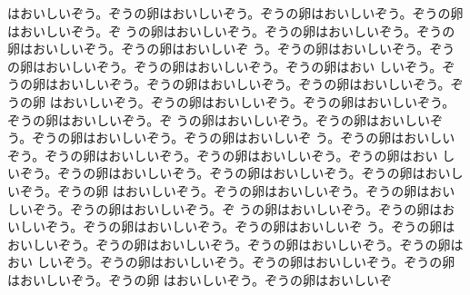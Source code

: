 はおいしいぞう。ぞうの卵はおいしいぞう。ぞうの卵はおいしいぞう。ぞうの卵はおいしいぞう。ぞ
うの卵はおいしいぞう。ぞうの卵はおいしいぞう。ぞうの卵はおいしいぞう。ぞうの卵はおいしいぞ
う。ぞうの卵はおいしいぞう。ぞうの卵はおいしいぞう。ぞうの卵はおいしいぞう。ぞうの卵はおい
しいぞう。ぞうの卵はおいしいぞう。ぞうの卵はおいしいぞう。ぞうの卵はおいしいぞう。ぞうの卵
はおいしいぞう。ぞうの卵はおいしいぞう。ぞうの卵はおいしいぞう。ぞうの卵はおいしいぞう。ぞ
うの卵はおいしいぞう。ぞうの卵はおいしいぞう。ぞうの卵はおいしいぞう。ぞうの卵はおいしいぞ
う。ぞうの卵はおいしいぞう。ぞうの卵はおいしいぞう。ぞうの卵はおいしいぞう。ぞうの卵はおい
しいぞう。ぞうの卵はおいしいぞう。ぞうの卵はおいしいぞう。ぞうの卵はおいしいぞう。ぞうの卵
はおいしいぞう。ぞうの卵はおいしいぞう。ぞうの卵はおいしいぞう。ぞうの卵はおいしいぞう。ぞ
うの卵はおいしいぞう。ぞうの卵はおいしいぞう。ぞうの卵はおいしいぞう。ぞうの卵はおいしいぞ
う。ぞうの卵はおいしいぞう。ぞうの卵はおいしいぞう。ぞうの卵はおいしいぞう。ぞうの卵はおい
しいぞう。ぞうの卵はおいしいぞう。ぞうの卵はおいしいぞう。ぞうの卵はおいしいぞう。ぞうの卵
はおいしいぞう。ぞうの卵はおいしいぞ